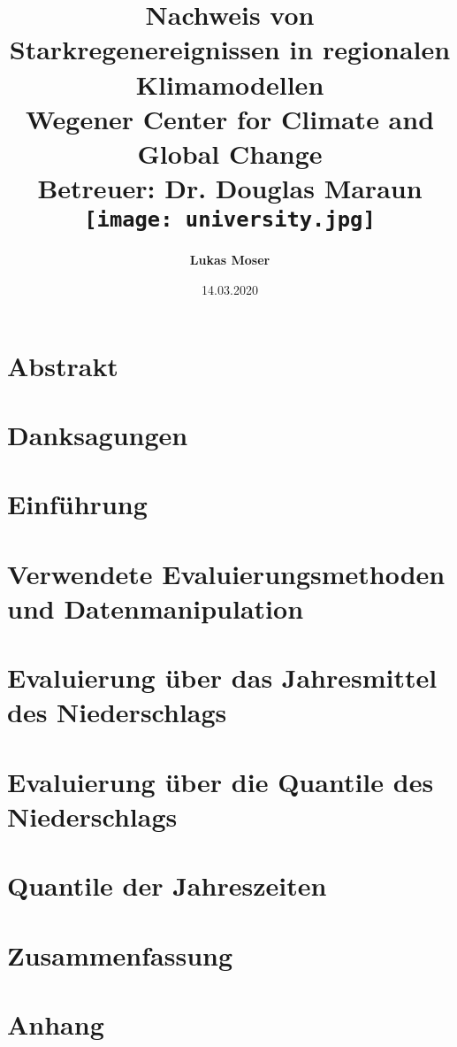 \documentclass[12pt,twoside]{report}
\title{
	{\textbf{Nachweis von Starkregenereignissen in regionalen Klimamodellen}}\\
	\vspace{20pt}
	{\Large Wegener Center for Climate and Global Change}\\
	{\large Betreuer: Dr. Douglas Maraun}\\
	\vspace{20pt}
	{\texttt{[image: university.jpg]}}\\
}
\author{\Large{\textbf{Lukas Moser}}}
\date{14.03.2020}
\begin{document}
	\maketitle

	
	\chapter*{Abstrakt}
	
	
	\chapter*{Danksagungen}
	
	\tableofcontents
	
	\chapter{Einführung}
	\label{chap:intro}
	
	
	\chapter{Verwendete Evaluierungsmethoden und Datenmanipulation}
	\label{chap:methods}
	
	
	\chapter{Evaluierung über das Jahresmittel des Niederschlags}
	\label{chap:mean}
	
	
	\chapter{Evaluierung über die Quantile des Niederschlags}
	\label{chap:quantile}
	
	
	\chapter{Quantile der Jahreszeiten}
	\label{chap:quantile_seasons}
	
	
	\chapter{Zusammenfassung}
	\label{chap:conclusion}
	
	
	\appendix
		\bgroup
		\titleformat{\chapter}{}{}{0pt}{\normalfont\Large\bfseries}
		\titlespacing*{\chapter}{0pt}{0pt}{20pt}
		\chapter{Anhang}
		
		
	\egroup
	\printbibliography[title=Referenzen]
\end{document}
